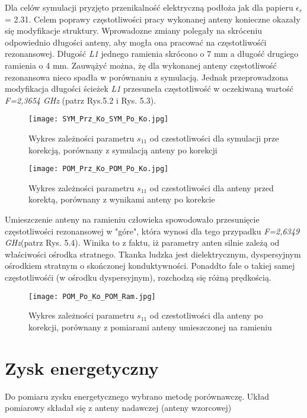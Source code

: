 \newpage
Dla celów symulacji pryzjęto przenikalność elektryczną podłoża jak dla papieru $\epsilon_{r}$ = 2.31. Celem poprawy częstotliwości pracy wykonanej anteny konieczne okazały się modyfikacje struktury. Wprowadozne zmiany polegały na skróceniu odpowiednio długości anteny, aby mogła ona pracować na częstotliwośći rezonansowej. Długość \emph{L1} jednego ramienia skrócono o 7 mm a długość drugiego ramienia o 4 mm. Zauwążyć można, żę dla wykonanej anteny częstotliwość rezonansowa nieco spadła w porównaniu z symulacją. Jednak przeprowadzona modyfikacja długości ścieżek \emph{L1} przesuneła częstotliwość w oczekiwaną wartość \emph{F=2,3654 GHz} (patrz Rys.5.2 i Rys. 5.3).  

\begin{figure}[h!]
\centering
	\texttt{[image: SYM\_Prz\_Ko\_SYM\_Po\_Ko.jpg]}
	\caption{Wykres zależności parametru $s_{11}$ od czestotliwości dla symulacji prze korekcją, porównany z symulacją anteny po korekcji}
\end{figure}


\begin{figure}[h!]
\centering
	\texttt{[image: POM\_Prz\_Ko\_POM\_Po\_Ko.jpg]}
	\caption{Wykres zależności parametru $s_{11}$ od czestotliwości dla anteny przed korektą, porównany z wynikami anteny po korekcie}
\end{figure}


\newpage
\noindent
\newline Umieszczenie anteny na ramieniu człowieka spowodowało przesunięcie częstotliwości rezonansowej w "góre", która wynosi dla tego przypadku \emph{F=2,6349 GHz}(patrz Rys. 5.4). Winika to z faktu, iż parametry anten silnie zależą od właściwości ośrodka stratnego.  
Tkanka ludzka jest dielektrycznym, dyspersyjnym ośrodkiem stratnym o skończonej konduktywności. Ponaddto fale o takiej samej częstotliwośći (w ośrodku dyspersyjnym), rozchodzą się różną prędkością. 

\begin{figure}[h!]
\centering
	\texttt{[image: POM\_Po\_Ko\_POM\_Ram.jpg]}
	\caption{Wykres zależności parametru $s_{11}$ od czestotliwości dla anteny po korekcji, porównany z pomiarami anteny umieszczonej na ramieniu}
\end{figure}


\newpage
\section{Zysk energetyczny}
Do pomiaru zysku energetycznego wybrano metodę porównawczę. Układ pomiarowy składał się z anteny nadawczej  (anteny wzorcowej)

